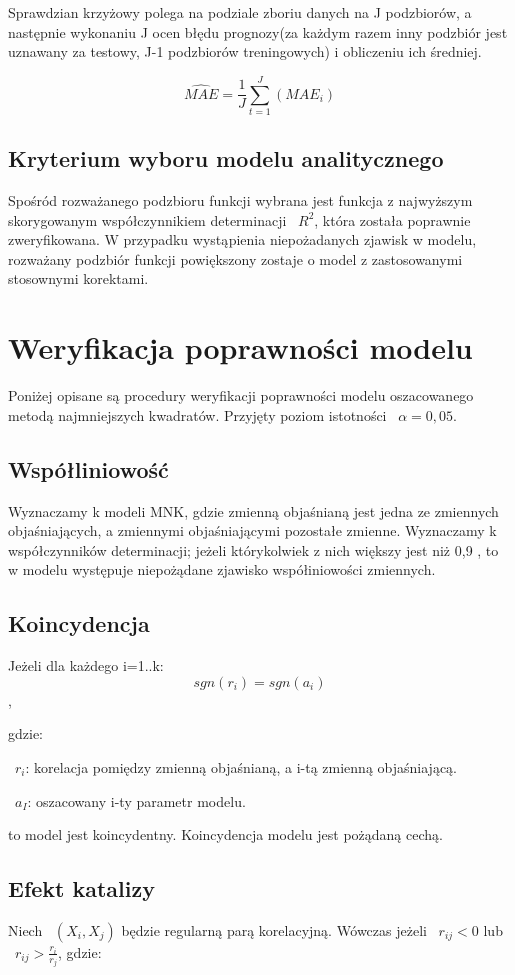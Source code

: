 \documentclass{article}
\begin{document}
Sprawdzian krzyżowy polega na podziale zboriu danych na J podzbiorów, a następnie wykonaniu J ocen błędu prognozy(za każdym razem inny podzbiór jest uznawany za testowy, J-1 podzbiorów treningowych) i obliczeniu ich średniej.

\[\hat{MAE}= \frac{1}{J} \sum_{t=1}^{J} ( MAE_i ) \]

\subsection{Kryterium wyboru modelu analitycznego}
Spośród rozważanego podzbioru funkcji wybrana jest funkcja z najwyższym skorygowanym współczynnikiem determinacji ~$R^2$, która została poprawnie zweryfikowana. W przypadku wystąpienia niepożadanych zjawisk w modelu, rozważany podzbiór funkcji powiększony zostaje o model z zastosowanymi stosownymi korektami.


\newpage
\section{Weryfikacja poprawności modelu}
Poniżej opisane są procedury weryfikacji poprawności modelu oszacowanego metodą najmniejszych kwadratów. Przyjęty poziom istotności ~$\alpha=0,05$.

\subsection{Współliniowość}
Wyznaczamy k modeli MNK, gdzie zmienną objaśnianą jest jedna ze zmiennych objaśniających, a zmiennymi objaśniającymi pozostałe zmienne. Wyznaczamy k współczynników determinacji; jeżeli którykolwiek z nich większy jest niż 0,9 , to w modelu występuje niepożądane zjawisko współiniowości zmiennych.

\subsection{Koincydencja}
Jeżeli dla każdego i=1..k:
\[sgn(r_i) = sgn(a_i)\],

gdzie:

~$r_i$: korelacja pomiędzy zmienną objaśnianą, a i-tą zmienną objaśniającą.

~$a_I$: oszacowany i-ty parametr modelu.

to model jest koincydentny. Koincydencja modelu jest pożądaną cechą.

\subsection{Efekt katalizy}
Niech ~$(X_i, X_j)$ będzie regularną parą korelacyjną. Wówczas jeżeli ~$r_{ij} < 0$ lub ~$r_{ij} > \frac{r_i}{r_j}$, gdzie:
\end{document}
